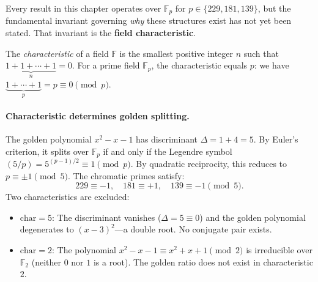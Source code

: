 Every result in this chapter operates over $\mathbb{F}_p$ for $p \in \{229, 181, 139\}$, but the fundamental invariant governing \emph{why} these structures exist has not yet been stated. That invariant is the \textbf{field characteristic}.

\begin{definition}
The \emph{characteristic} of a field $\mathbb{F}$ is the smallest positive integer $n$ such that $\underbrace{1 + 1 + \cdots + 1}_{n} = 0$. For a prime field $\mathbb{F}_p$, the characteristic equals $p$: we have $\underbrace{1 + \cdots + 1}_{p} = p \equiv 0 \pmod{p}$.
\end{definition}

\paragraph{Characteristic determines golden splitting.}
The golden polynomial $x^2 - x - 1$ has discriminant $\Delta = 1 + 4 = 5$. By Euler's criterion, it splits over $\mathbb{F}_p$ if and only if the Legendre symbol $(5/p) = 5^{(p-1)/2} \equiv 1 \pmod{p}$. By quadratic reciprocity, this reduces to $p \equiv \pm 1 \pmod{5}$. The chromatic primes satisfy:
\[
229 \equiv -1, \quad 181 \equiv +1, \quad 139 \equiv -1 \pmod{5}.
\]
Two characteristics are excluded:
\begin{itemize}
\item $\mathrm{char} = 5$: The discriminant vanishes ($\Delta = 5 \equiv 0$) and the golden polynomial degenerates to $(x - 3)^2$---a double root. No conjugate pair exists.
\item $\mathrm{char} = 2$: The polynomial $x^2 - x - 1 \equiv x^2 + x + 1 \pmod{2}$ is irreducible over $\mathbb{F}_2$ (neither $0$ nor $1$ is a root). The golden ratio does not exist in characteristic $2$.
\end{itemize}

